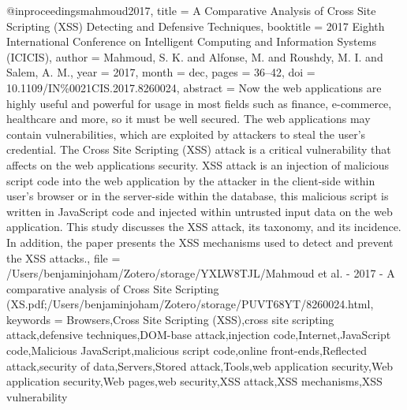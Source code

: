 @inproceedings{mahmoud2017,
  title = {A Comparative Analysis of {{Cross Site Scripting}} ({{XSS}}) Detecting and Defensive Techniques},
  booktitle = {2017 {{Eighth International Conference}} on {{Intelligent Computing}} and {{Information Systems}} ({{ICICIS}})},
  author = {Mahmoud, S. K. and Alfonse, M. and Roushdy, M. I. and Salem, A. M.},
  year = {2017},
  month = dec,
  pages = {36--42},
  doi = {10.1109/IN\%0021CIS.2017.8260024},
  abstract = {Now the web applications are highly useful and powerful for usage in most fields such as finance, e-commerce, healthcare and more, so it must be well secured. The web applications may contain vulnerabilities, which are exploited by attackers to steal the user's credential. The Cross Site Scripting (XSS) attack is a critical vulnerability that affects on the web applications security. XSS attack is an injection of malicious script code into the web application by the attacker in the client-side within user's browser or in the server-side within the database, this malicious script is written in JavaScript code and injected within untrusted input data on the web application. This study discusses the XSS attack, its taxonomy, and its incidence. In addition, the paper presents the XSS mechanisms used to detect and prevent the XSS attacks.},
  file = {/Users/benjaminjoham/Zotero/storage/YXLW8TJL/Mahmoud et al. - 2017 - A comparative analysis of Cross Site Scripting (XS.pdf;/Users/benjaminjoham/Zotero/storage/PUVT68YT/8260024.html},
  keywords = {Browsers,Cross Site Scripting (XSS),cross site scripting attack,defensive techniques,DOM-base attack,injection code,Internet,JavaScript code,Malicious JavaScript,malicious script code,online front-ends,Reflected attack,security of data,Servers,Stored attack,Tools,web application security,Web application security,Web pages,web security,XSS attack,XSS mechanisms,XSS vulnerability}
}

